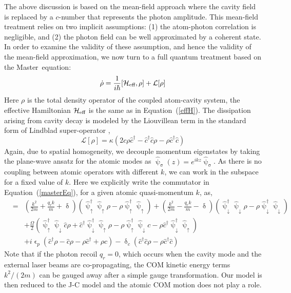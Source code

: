 \documentclass[atoms,article,accept,moreauthors,pdftex,12pt,a4paper]{mdpi}
\def\be{\begin{equation}}
\def\ee{\end{equation}}
\def\ba{\begin{eqnarray}}
\def\ea{\end{eqnarray}}
\begin{document}
The above discussion is based on the mean-field approach where the cavity field is replaced by a $c$-number that represents the photon amplitude. This mean-field treatment relies on two implicit assumptions: (1) the atom-photon correlation is negligible, and (2) the photon field can be well approximated by a coherent state. In order to examine the validity of these assumption, and hence the validity of the mean-field approximation, we now turn to a full quantum treatment based on the Master~equation:
\be
\dot{\rho} = \frac{1}{i\hbar}[{\cal H}_{\text{eff}},\rho]+\mathcal{L}[\rho] \, \label{masterEq}
\ee
Here $\rho$ is the total density operator of the coupled atom-cavity system, the effective Hamiltonian ${\cal H}_{\text{eff}}$ is the same as in Equation~(\ref{effH}). The dissipation arising from cavity decay is modeled by the Liouvillean term in the
standard form of Lindblad super-operator \cite{L1, L2},
\be
\mathcal{L}[\rho] = \kappa (2c\rho \hat{c}^\dagger-\hat{c}^\dagger \hat{c}\rho-\rho \hat{c}^\dagger \hat{c})\,\label{Lindblad}
\ee
Again, due to spatial homogeneity, we decouple momentum eigenstates by taking the plane-wave ansatz for the atomic modes as $\hat{\uppsi}_\upsigma({z})=e^{i{k}{z}}\hat{\uppsi}_\upsigma$. As there is no coupling between atomic operators with different $k$, we can work in the subspace for a fixed value of $k$. Here we explicitly write the commutator in Equation~(\ref{masterEq}), for a given atomic quasi-momentum $k$, as,
\ba
[{\cal H}_{\text{eff}}({k}),\rho] & = & \left(\frac{{ k}^{2}}{2m}+\frac{q_{r}k}{m}+\updelta\right)\left(\hat{\uppsi}_{\uparrow}^{\dagger} \hat{\uppsi}_{\uparrow}\rho-\rho \hat{\uppsi}_{\uparrow}^{\dagger} \hat{\uppsi}_{\uparrow}\right)+\left(\frac{{k}^{2}}{2m}-\frac{q_{r}k}{m}-\updelta\right) \left(\hat{\uppsi}_{\downarrow}^{\dagger} \hat{\uppsi}_{\downarrow}\rho-\rho \hat{\uppsi}_{\downarrow}^{\dagger} \hat{\uppsi}_{\downarrow}\right)\nonumber\\
 &  & + \frac{\Omega}{2}\left(\hat{\uppsi}_{\uparrow}^{\dagger} \hat{\uppsi}_{\downarrow} \hat{c} \rho+\hat{c}^{\dagger} \hat{\uppsi}_{\downarrow}^{\dagger} \hat{\uppsi}_{\uparrow}\rho-\rho \hat{\uppsi}_{\uparrow}^{\dagger} \hat{\uppsi}_{\downarrow}c-\rho \hat{c}^{\dagger} \hat{\uppsi}_{\downarrow}^{\dagger} \hat{\uppsi}_{\uparrow}\right)\nonumber\\
&& + i\upvarepsilon_{p}\left(\hat{c}^{\dagger}\rho-\hat{c}\rho-\rho \hat{c}^{\dagger}+\rho \hat{c}\right)-\updelta_{c}\left(\hat{c}^{\dagger}\hat{c}\rho-\rho \hat{c}^{\dagger}\hat{c}\right)\,
\ea
Note that if the photon recoil $q_r=0$, which occurs when the cavity mode and the external laser beams are co-propagating, the COM kinetic energy terms $k^2/(2m)$ can be gauged away after a simple gauge transformation. Our model is then reduced to the J-C model and the atomic COM motion does not play a role.
\end{document}
